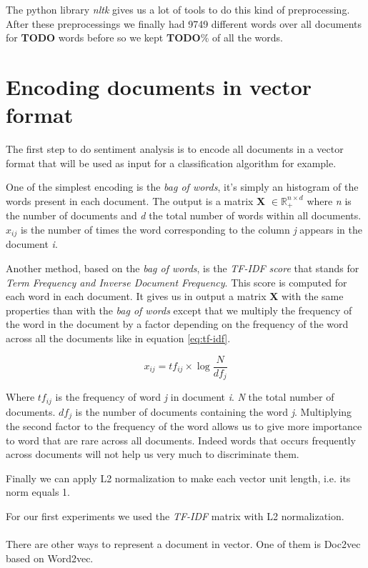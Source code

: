 \documentclass{article}
\begin{document}
The python library \textit{nltk} gives us a lot of tools to do this kind of preprocessing. After these preprocessings we finally had 9749 different words over all documents for \textbf{TODO} words before so we kept \textbf{TODO}\% of all the words.



\section{Encoding documents in vector format}

The first step to do sentiment analysis is to encode all documents in a vector format that will be used as input for a classification algorithm for example. 

One of the simplest encoding is the \textit{bag of words}, it's simply an histogram of the words present in each document. The output is a matrix \textbf{X} $\in \mathbb{R}^{n \times d}_{+}$ where \textit{n} is the number of documents and \textit{d} the total number of words within all documents. $x_{ij}$ is the number of times the word corresponding to the column \textit{j} appears in the document \textit{i}.

Another method, based on the \textit{bag of words}, is the \textit{TF-IDF score} that stands for \textit{Term Frequency and Inverse Document Frequency}. This score is computed for each word in each document. It gives us in output a matrix \textbf{X} with the same properties than with the \textit{bag of words} except that we multiply the frequency of the word in the document by a factor depending on the frequency of the word across all the documents like in equation \ref{eq:tf-idf}. 

\begin{equation}
x_{ij} = tf_{ij} \times \log\frac{N}{df_{j}}
\label{eq:tf-idf}
\end{equation}

Where $tf_{ij}$ is the frequency of word \textit{j} in document \textit{i}. \textit{N} the total number of documents. $df_{j}$ is the number of documents containing the word \textit{j}. Multiplying the second factor to the frequency of the word allows us to give more importance to word that are rare across all documents. Indeed words that occurs frequently across documents will not help us very much to discriminate them.

Finally we can apply L2 normalization to make each vector unit length, i.e. its norm equals 1. 

For our first experiments we used the \textit{TF-IDF} matrix with L2 normalization.
\\\\
There are other ways to represent a document in vector. One of them is Doc2vec based on Word2vec.
\end{document}
